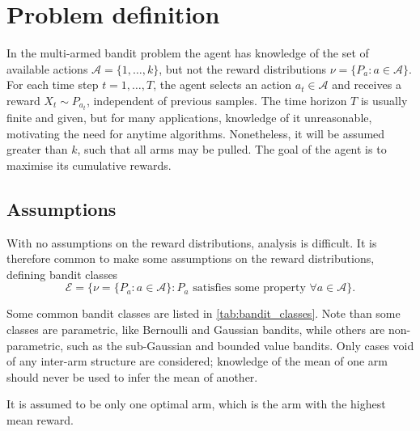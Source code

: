 \section{Problem definition}
In the multi-armed bandit problem the agent has knowledge of the set of available actions $\mathcal{A}=\{1, \dots, k\}$, but not the reward distributions $\nu = \{P_a : a \in \mathcal{A}\}$.
For each time step $t=1, \dots, T$, the agent selects an action $a_t \in \mathcal{A}$ and receives a reward $X_t \sim P_{a_t}$, independent of previous samples.
The time horizon $T$ is usually finite and given, but for many applications, knowledge of it unreasonable, motivating the need for anytime algorithms.
Nonetheless, it will be assumed greater than $k$, such that all arms may be pulled.
The goal of the agent is to maximise its cumulative rewards.

\subsection{Assumptions}
With no assumptions on the reward distributions, analysis is difficult.
It is therefore common to make some assumptions on the reward distributions, defining bandit classes
\begin{equation}
    \mathcal{E} = \{\nu = \{P_a : a \in \mathcal{A}\} : P_a \text{ satisfies some property } \forall a \in \mathcal{A}\}.
\end{equation}

Some common bandit classes are listed in \cref{tab:bandit_classes}.
Note than some classes are parametric, like Bernoulli and Gaussian bandits, while others are non-parametric, such as the sub-Gaussian and bounded value bandits.
Only cases void of any inter-arm structure are considered; knowledge of the mean of one arm should never be used to infer the mean of another.

It is assumed to be only one optimal arm, which is the arm with the highest mean reward.



